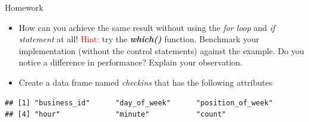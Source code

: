 \documentclass[12pt]{book}\usepackage{knitr}
\begin{document}
\begin{DIY}{Homework}
 \begin{itemize}
  \item \noindent How can you achieve the same result without using the \emph{for loop} and \emph{if statement} at all! \textcolor{red}{Hint:} try the \textbf{\emph{which()}} function. Benchmark your implementation (without the control statements) against the example. Do you notice a difference in performance? Explain your observation.
  \item \noindent Create a data frame named \emph{checkins} that has the following attributes
\end{itemize}
\end{DIY}

\begin{knitrout}
\color{fgcolor}\begin{kframe}
\begin{alltt}
\end{alltt}
\begin{verbatim}
## [1] "business_id"      "day_of_week"      "position_of_week"
## [4] "hour"             "minute"           "count"
\end{verbatim}
\end{kframe}
\end{knitrout}
\end{document}
